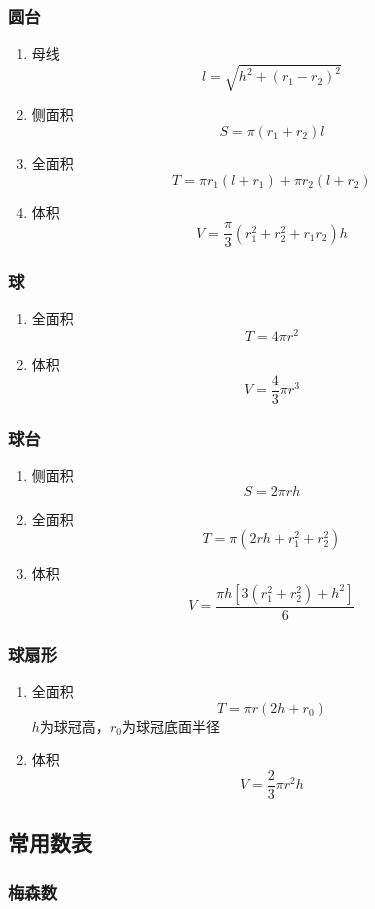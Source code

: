 \documentclass[a4paper]{article}
\begin{document}
\subsubsection{圆台}

\begin{enumerate}
	\item 母线
		$$l=\sqrt{h^2+(r_1-r_2)^2}$$
	\item 侧面积
		$$S=\pi(r_1+r_2)l$$
	\item 全面积
		$$T=\pi r_1(l+r_1)+\pi r_2(l+r_2)$$
	\item 体积
		$$V=\frac{\pi}{3}(r_1^2+r_2^2+r_1r_2)h$$
\end{enumerate}

\subsubsection{球}

\begin{enumerate}
	\item 全面积
		$$T=4\pi r^2$$
	\item 体积
		$$V=\frac{4}{3}\pi r^3$$
\end{enumerate}

\subsubsection{球台}

\begin{enumerate}
	\item 侧面积
		$$S=2\pi rh$$
	\item 全面积
		$$T=\pi(2rh+r_1^2+r_2^2)$$
	\item 体积
		$$V=\frac{\pi h[3(r_1^2+r_2^2)+h^2]}{6}$$
\end{enumerate}

\subsubsection{球扇形}

\begin{enumerate}
	\item 全面积
		$$T=\pi r(2h+r_0)$$
		$h$为球冠高，$r_0$为球冠底面半径
	\item 体积
		$$V=\frac{2}{3}\pi r^2h$$
\end{enumerate}

\subsection{常用数表}

\subsubsection{梅森数}
\end{document}
